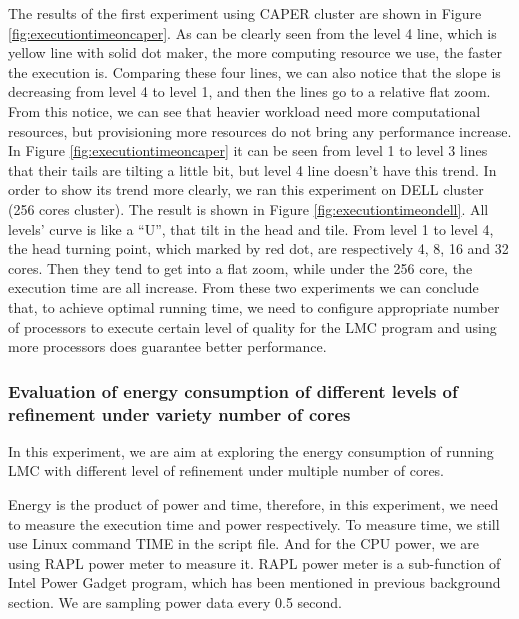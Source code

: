 \documentclass[10pt, conference, compsocconf]{IEEEtran}
\begin{document}
The results of the first experiment using CAPER cluster are shown in Figure \ref{fig:executiontimeoncaper}. As can be clearly seen from the level 4 line, which is yellow line with solid dot maker, the more computing resource we use, the faster the execution is. Comparing these four lines, we can also notice that the slope is decreasing from level 4 to level 1, and then the lines go to a relative flat zoom. From this notice, we can see that heavier workload need more computational resources, but provisioning more resources do not bring any performance increase. In Figure \ref{fig:executiontimeoncaper} it can be seen from level 1 to level 3 lines that their tails are tilting a little bit, but level 4 line doesn’t have this trend. In order to show its trend more clearly, we ran this experiment on DELL cluster (256 cores cluster). The result is shown in Figure \ref{fig:executiontimeondell}. All levels' curve is like a ``U'', that tilt in the head and tile. From level 1 to level 4, the head turning point, which marked by red dot, are respectively 4, 8, 16 and 32 cores. Then they tend to get into a flat zoom, while under the 256 core, the execution time are all increase. From these two experiments we can conclude that, to achieve optimal running time, we need to configure appropriate number of processors to execute certain level of quality for the LMC program and using more processors does guarantee better performance.



\subsubsection{Evaluation of energy consumption of different levels of refinement under variety number of cores}
In this experiment, we are aim at exploring the energy consumption of running LMC with different level of refinement under multiple number of cores. 


Energy is the product of power and time, therefore, in this experiment, we need to measure the execution time and power respectively. To measure time, we still use Linux command TIME in the script file. And for the CPU power, we are using RAPL power meter to measure it. RAPL power meter is a sub-function of Intel Power Gadget program, which has been mentioned in previous background section. We are sampling power data every 0.5 second.
\end{document}
